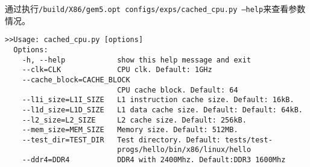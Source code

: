 \documentclass{article}
\begin{document}
通过执行\texttt{/build/X86/gem5.opt configs/exps/cached\_cpu.py --help}来查看参数情况。
\begin{lstlisting}[style=bashstyle]
>>Usage: cached_cpu.py [options]
  Options:
    -h, --help            show this help message and exit
    --clk=CLK             CPU clk. Default: 1GHz
    --cache_block=CACHE_BLOCK
                          CPU cache block. Default: 64
    --l1i_size=L1I_SIZE   L1 instruction cache size. Default: 16kB.
    --l1d_size=L1D_SIZE   L1 data cache size. Default: Default: 64kB.
    --l2_size=L2_SIZE     L2 cache size. Default: 256kB.
    --mem_size=MEM_SIZE   Memory size. Default: 512MB.
    --test_dir=TEST_DIR   Test directory. Default: tests/test-
                          progs/hello/bin/x86/linux/hello
    --ddr4=DDR4           DDR4 with 2400Mhz. Default:DDR3 1600Mhz
\end{lstlisting}
\end{document}
